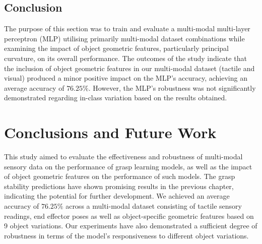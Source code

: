 \documentclass[11pt, a4paper]{report}
\begin{document}
\section{Conclusion}\label{sec:5.5}
The purpose of this section was to train and evaluate a multi-modal multi-layer perceptron (MLP) utilising primarily multi-modal dataset combinations while examining the impact of object geometric features, particularly principal curvature, on its overall performance. The outcomes of the study indicate that the inclusion of object geometric features in our multi-modal dataset (tactile and visual) produced a minor positive impact on the MLP's accuracy, achieving an average accuracy of $76.25\%$. However, the MLP's robustness was not significantly demonstrated regarding in-class variation based on the results obtained.



\chapter{Conclusions and Future Work}
\label{chap:6}
This study aimed to evaluate the effectiveness and robustness of multi-modal sensory data on the performance of grasp learning models, as well as the impact of object geometric features on the performance of such models. The grasp stability predictions have shown promising results in the previous chapter, indicating the potential for further development. We achieved an average accuracy of $76.25\%$ across a multi-modal dataset consisting of tactile sensory readings, end effector poses as well as object-specific geometric features based on 9 object variations. Our experiments have also demonstrated a sufficient degree of robustness in terms of the model's responsiveness to different object variations.\\
\end{document}
